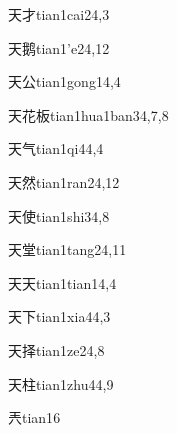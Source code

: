 \begin{verbete}{天才}{tian1cai2}{4,3}
\end{verbete}

\begin{verbete}{天鹅}{tian1'e2}{4,12}
\end{verbete}

\begin{verbete}{天公}{tian1gong1}{4,4}
\end{verbete}

\begin{verbete}{天花板}{tian1hua1ban3}{4,7,8}
\end{verbete}

\begin{verbete}{天气}{tian1qi4}{4,4}
\end{verbete}

\begin{verbete}{天然}{tian1ran2}{4,12}
\end{verbete}

\begin{verbete}{天使}{tian1shi3}{4,8}
\end{verbete}

\begin{verbete}{天堂}{tian1tang2}{4,11}
\end{verbete}

\begin{verbete}{天天}{tian1tian1}{4,4}
\end{verbete}

\begin{verbete}{天下}{tian1xia4}{4,3}
\end{verbete}

\begin{verbete}{天择}{tian1ze2}{4,8}
\end{verbete}

\begin{verbete}{天柱}{tian1zhu4}{4,9}
\end{verbete}

\begin{verbete}{兲}{tian1}{6}
\end{verbete}

